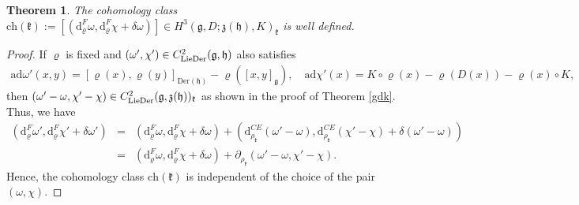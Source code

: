 \documentclass[12pt]{amsart}
\newtheorem{thm}{Theorem}[section]
\newcommand{\g}{\mathfrak g}
\newcommand{\h}{\mathfrak h}
\newcommand{\frkk}{\mathfrak k}
\newcommand{\frkz}{\mathfrak z}
\newcommand{\dM}{\mathrm{d}}
\newcommand{\LD}{{\rm LieDer }}
\newcommand{\Der}{\mathrm{Der}}
\newcommand{\ad}{\mathrm{ad}}
\begin{document}
\begin{thm}\label{defich}
    The cohomology class $\mathrm{ch}(\frkk):=[(\dM^F_{\varrho}\omega,\dM^F_{\varrho}\chi+\delta\omega)]\in H^3(\g,D;\frkz(\h),K)_{\frkk}$ is well defined.
    \end{thm}
    \begin{proof}
        If $\varrho$ is fixed and $(\omega',\chi')\in C^2_{\LD}(\g,\h)$ also satisfies 
\begin{eqnarray*}
    \ad \omega'(x,y)=[\varrho(x),\varrho(y)]_{\Der(\h)}-\varrho([x,y]_{\g}),\quad
  \ad\chi'(x)=K\circ\varrho(x)-\varrho(D(x))-\varrho(x)\circ K,
\end{eqnarray*}
then $(\omega'-\omega,\chi'-\chi)\in C^2_{\LD}(\g,\frkz(\h))_{\frkk}$ as shown in the proof of Theorem \ref{gdk}. Thus, we have
        \begin{eqnarray*}
(\dM^F_{\varrho}\omega',\dM^F_{\varrho}\chi'+\delta\omega')
        &=&(\dM^F_{\varrho}\omega,\dM^F_{\varrho}\chi+\delta\omega)+(\dM^{CE}_{\rho_\frkk}(\omega'-\omega),\dM^{CE}_{\rho_\frkk}(\chi'-\chi)+\delta(\omega'-\omega))\\
        &=&(\dM^F_{\varrho}\omega,\dM^F_{\varrho}\chi+\delta\omega)+\partial_{\rho_\frkk}(\omega'-\omega,\chi'-\chi).
        \end{eqnarray*}
        Hence, the cohomology class $\mathrm{ch}(\frkk)$ is independent of the choice of the pair $(\omega,\chi)$.


\end{proof}
\end{document}
